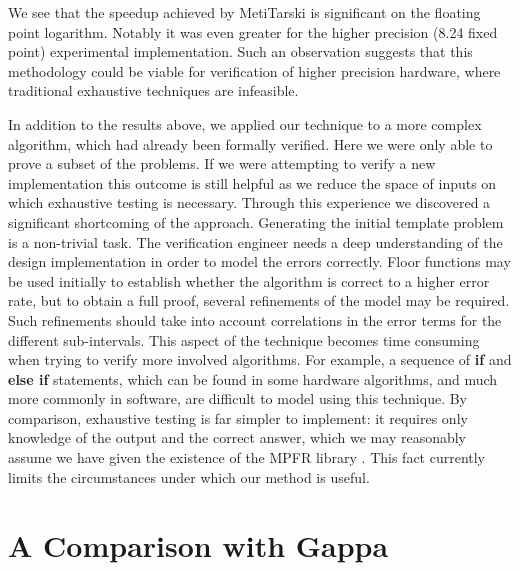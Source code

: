 \documentclass{fac}
\begin{document}
We see that the speedup achieved by MetiTarski is significant on the floating point logarithm. Notably it was even greater for the higher precision (8.24 fixed point) experimental implementation. Such an observation suggests that this methodology could be viable for verification of higher precision hardware, where traditional exhaustive techniques are infeasible. 

In addition to the results above, we applied our technique to a more complex algorithm, which had already been formally verified. Here we were only able to prove a subset of the problems. If we were attempting to verify a new implementation this outcome is still helpful as we reduce the space of inputs on which exhaustive testing is necessary. Through this experience we discovered a significant shortcoming of the approach. Generating the initial template problem is a non-trivial task. The verification engineer needs a deep understanding of the design implementation in order to model the errors correctly. Floor functions may be used initially to establish whether the algorithm is correct to a higher error rate, but to obtain a full proof, several refinements of the model may be required. Such refinements should take into account correlations in the error terms for the different sub-intervals. This aspect of the technique becomes time consuming when trying to verify more involved algorithms. For example, a sequence of \textbf{if} and \textbf{else if} statements, which can be found in some hardware algorithms, and much more commonly in software, are difficult to model using this technique. By comparison, exhaustive testing is far simpler to implement: it requires only knowledge of the output and the correct answer, which we may reasonably assume we have given the existence of the MPFR library \cite{fousse2007mpfr}. This fact currently limits the circumstances under which our method is useful. 

\section{A Comparison with Gappa}
\label{gappa}
\end{document}

